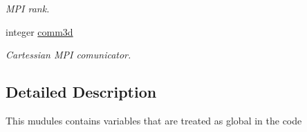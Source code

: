 \begin{DoxyCompactItemize}
\begin{DoxyCompactList}\small\item\em M\+P\+I rank. \end{DoxyCompactList}\item 
\hypertarget{namespaceglobals_a4bc8f1b5670efd802d57dce2c385b6d9}{}integer \hyperlink{namespaceglobals_a4bc8f1b5670efd802d57dce2c385b6d9}{comm3d}\label{namespaceglobals_a4bc8f1b5670efd802d57dce2c385b6d9}

\begin{DoxyCompactList}\small\item\em Cartessian M\+P\+I comunicator. \end{DoxyCompactList}\end{DoxyCompactItemize}


\subsection{Detailed Description}
This mudules contains variables that are treated as global in the code 